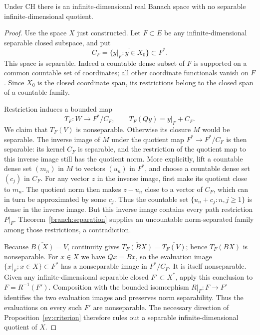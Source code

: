 \begin{theorem}\label{twist:counterexample}
Under CH there is an infinite-dimensional real Banach space with no
separable infinite-dimensional quotient.
\end{theorem}

\begin{proof}
Use the space $X$ just constructed. Let $F\subset E$ be any
infinite-dimensional separable closed subspace, and put
\[
 C_F=\overline{\{y|_F:y\in X_0\}}\subset F^*.
\]
This space is separable. Indeed a countable dense subset of $F$ is
supported on a common countable set of coordinates; all other coordinate
functionals vanish on $F$. Since $X_0$ is the closed coordinate span,
its restrictions belong to the closed span of a countable family.

Restriction induces a bounded map
\[
 T_F:W\longrightarrow F^*/C_F,\qquad
 T_F(Qy)=y|_F+C_F.
\]
We claim that $T_F(V)$ is nonseparable. Otherwise its closure $M$ would
be separable. The inverse image of $M$ under the quotient map
$F^*\to F^*/C_F$ is then separable: its kernel $C_F$ is separable, and the restriction of the quotient map
to this inverse image still has the quotient norm.  More explicitly, lift
a countable dense set $(m_n)$ in $M$ to vectors $(u_n)$ in $F^*$, and
choose a countable dense set $(c_j)$ in $C_F$.  For any vector $z$ in the
inverse image, first make its quotient close to $m_n$.  The quotient norm
then makes $z-u_n$ close to a vector of $C_F$, which can in turn be
approximated by some $c_j$.  Thus the countable set
$\{u_n+c_j:n,j\ge1\}$ is dense in the inverse image.
But this inverse image contains every path restriction $P|_F$.
Theorem~\ref{branch:separation} supplies an uncountable norm-separated
family among those restrictions, a contradiction.

Because $\overline{B(X)}=V$, continuity gives
$\overline{T_F(BX)}=\overline{T_F(V)}$; hence $T_F(BX)$ is nonseparable.
For $x\in X$ we have $Qx=Bx$, so the evaluation image
$\{x|_F:x\in X\}\subset F^*$ has a nonseparable image in $F^*/C_F$.
It is itself nonseparable. Given any infinite-dimensional separable closed $F'\subset X^*$,
apply this conclusion to $F=R^{-1}(F')$.  Composition with the bounded
isomorphism $R|_F:F\to F'$ identifies the two evaluation images and
preserves norm separability.  Thus the evaluations on every such $F'$
are nonseparable. The necessary direction of Proposition~\ref{ev:criterion}
therefore rules out a separable infinite-dimensional quotient of $X$.
\end{proof}

